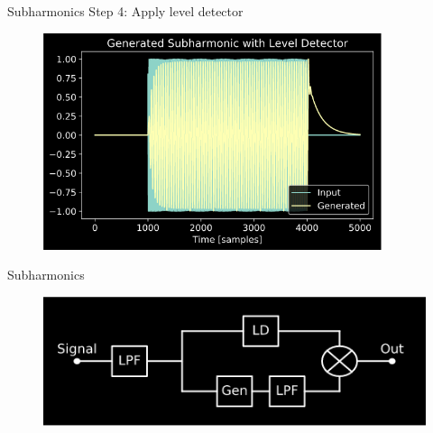 \begin{frame}{Subharmonics}
    Step 4: Apply level detector
    \begin{figure}
        \centering
        \includegraphics[height=2.5in]{../Subharmonics/Pics/LD_example.png}
    \end{figure}
\end{frame}

\begin{frame}{Subharmonics}
    \begin{figure}
        \centering
        \includegraphics[width=4.5in]{../Subharmonics/Pics/full_arch.png}
    \end{figure}
\end{frame}
